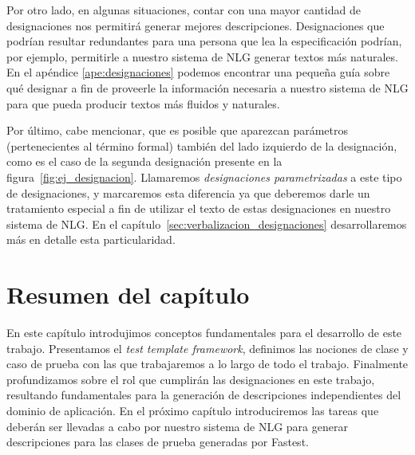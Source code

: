 Por otro lado, en algunas situaciones, contar con una mayor cantidad de designaciones nos permitirá generar mejores descripciones. Designaciones que podrían resultar redundantes para una persona que lea la especificación podrían, por ejemplo, permitirle a nuestro sistema de NLG generar textos más naturales. En el apéndice \ref{ape:designaciones} podemos encontrar una pequeña guía sobre qué designar a fin de proveerle la información necesaria a nuestro sistema de NLG para que pueda producir textos más fluidos y naturales.

Por último, cabe mencionar, que es posible que aparezcan parámetros (pertenecientes al término formal) también del lado izquierdo de la designación, como es el caso de la segunda designación presente en la figura~\ref{fig:ej_designacion}. Llamaremos \emph{designaciones parametrizadas} a este tipo de designaciones, y marcaremos esta diferencia ya que deberemos darle un tratamiento especial a fin de utilizar el texto de estas designaciones en nuestro sistema de NLG. En el capítulo~\ref{sec:verbalizacion_designaciones} desarrollaremos más en detalle esta particularidad. 


\section{Resumen del capítulo}
En este capítulo introdujimos conceptos fundamentales para el desarrollo de este trabajo. Presentamos el \textit{test template framework}, definimos las nociones de clase y caso de prueba con las que trabajaremos a lo largo de todo el trabajo. Finalmente profundizamos sobre el rol que cumplirán las designaciones en este trabajo, resultando fundamentales para la generación de descripciones independientes del dominio de aplicación. En el próximo capítulo introduciremos las tareas que deberán ser llevadas a cabo por nuestro sistema de NLG para generar descripciones para las clases de prueba generadas por Fastest.